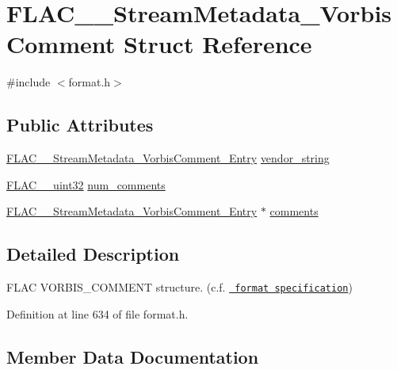 \hypertarget{struct_f_l_a_c_____stream_metadata___vorbis_comment}{}\section{F\+L\+A\+C\+\_\+\+\_\+\+Stream\+Metadata\+\_\+\+Vorbis\+Comment Struct Reference}
\label{struct_f_l_a_c_____stream_metadata___vorbis_comment}


{\ttfamily \#include $<$format.\+h$>$}

\subsection*{Public Attributes}
\begin{DoxyCompactItemize}
\item 
\mbox{\hyperlink{struct_f_l_a_c_____stream_metadata___vorbis_comment___entry}{F\+L\+A\+C\+\_\+\+\_\+\+Stream\+Metadata\+\_\+\+Vorbis\+Comment\+\_\+\+Entry}} \mbox{\hyperlink{struct_f_l_a_c_____stream_metadata___vorbis_comment_a7a6dd7bacee57f0a59ac2d843cb79f98}{vendor\+\_\+string}}
\item 
\mbox{\hyperlink{ordinals_8h_a9c4005ea7ef8d564b0cc993cdd0e4e5e}{F\+L\+A\+C\+\_\+\+\_\+uint32}} \mbox{\hyperlink{struct_f_l_a_c_____stream_metadata___vorbis_comment_a6b5a521443691bc3f195c97b60203a3e}{num\+\_\+comments}}
\item 
\mbox{\hyperlink{struct_f_l_a_c_____stream_metadata___vorbis_comment___entry}{F\+L\+A\+C\+\_\+\+\_\+\+Stream\+Metadata\+\_\+\+Vorbis\+Comment\+\_\+\+Entry}} $\ast$ \mbox{\hyperlink{struct_f_l_a_c_____stream_metadata___vorbis_comment_ab4065e0e2fcaac759616e9e339acfa19}{comments}}
\end{DoxyCompactItemize}


\subsection{Detailed Description}
F\+L\+AC V\+O\+R\+B\+I\+S\+\_\+\+C\+O\+M\+M\+E\+NT structure. (c.\+f. \href{../format.html\#metadata_block_vorbis_comment}{\texttt{ format specification}}) 

Definition at line 634 of file format.\+h.



\subsection{Member Data Documentation}
\mbox{\label{struct_f_l_a_c_____stream_metadata___vorbis_comment_ab4065e0e2fcaac759616e9e339acfa19}} 
